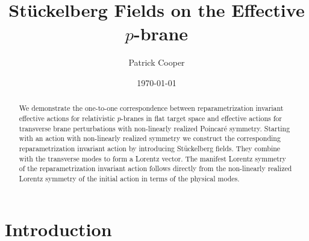 \documentclass[%
 reprint,
 amsmath,amssymb,
 aps,
]{revtex4-1}
\begin{document}
\title{St\"uckelberg Fields on the Effective $p$-brane}

\author{Patrick Cooper}

\date{\today}

\begin{abstract}
We  demonstrate the one-to-one correspondence between reparametrization invariant effective actions for relativistic  $p$-branes
in flat target space and effective actions for transverse brane perturbations with non-linearly realized Poincar\'e symmetry.
Starting with an action with non-linearly realized symmetry we construct the corresponding reparametrization invariant action by introducing
St\"uckelberg fields. They combine with the transverse modes to form a Lorentz vector. The manifest Lorentz symmetry of the reparametrization invariant action
follows directly from the non-linearly realized Lorentz symmetry of the initial action in terms of the physical modes.
\end{abstract}

\maketitle


\section{\label{sec:level1}Introduction}
\end{document}
